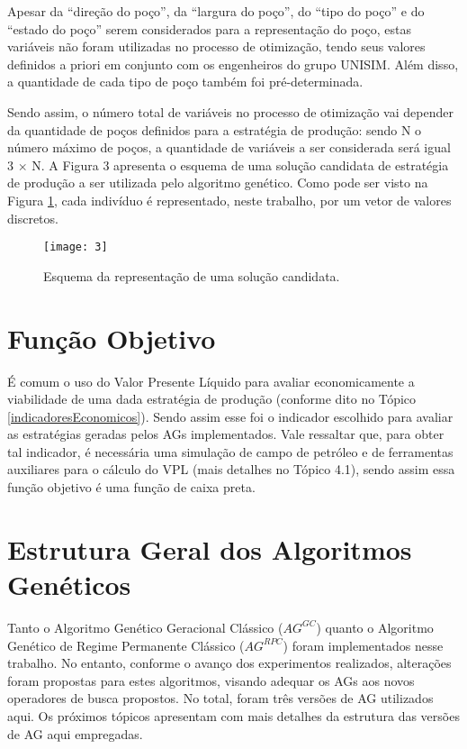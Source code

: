 Apesar da “direção do poço”, da “largura do poço”, do “tipo do poço” e do “estado do poço” serem considerados para a representação do poço, estas variáveis não foram utilizadas no processo de otimização, tendo seus valores definidos a priori em conjunto com os engenheiros do grupo UNISIM. Além disso, a quantidade de cada tipo de poço também foi pré-determinada. 

Sendo assim, o número total de variáveis no processo de otimização vai depender da quantidade de poços definidos para a estratégia de produção: sendo N o número máximo de poços, a quantidade de variáveis a ser considerada será igual 3 $\times$ N. A Figura 3 apresenta o esquema de uma solução candidata de estratégia de produção a ser utilizada pelo algoritmo genético. Como pode ser visto na Figura \ref{fig:fig3_1}, cada indivíduo é representado, neste trabalho, por um vetor de valores discretos.

\begin{figure}[htb]
  \centering
  \texttt{[image: 3]}
  \caption{Esquema da representação de uma solução candidata.}
  \label{fig:fig3_1}
\end{figure}

\section{Função Objetivo}
\label{ch:3_FuncaoObjetivo}
É comum o uso do Valor Presente Líquido para avaliar economicamente a viabilidade de uma dada estratégia de produção (conforme dito no Tópico \ref{indicadoresEconomicos}). Sendo assim esse foi o indicador escolhido para avaliar as estratégias geradas pelos AGs implementados. Vale ressaltar que, para obter tal indicador, é necessária uma simulação de campo de petróleo e de ferramentas auxiliares para o cálculo do VPL (mais detalhes no Tópico 4.1), sendo assim essa função objetivo é uma função de caixa preta. 

\section{Estrutura Geral dos Algoritmos Genéticos}

Tanto o Algoritmo Genético Geracional Clássico ($AG^{GC}$) quanto o Algoritmo Genético de Regime Permanente Clássico ($AG^{RPC}$) foram implementados nesse trabalho. No entanto, conforme o avanço dos experimentos realizados, alterações foram propostas para estes algoritmos, visando adequar os AGs aos novos operadores de busca propostos.  No total, foram três versões de AG utilizados aqui.  Os próximos tópicos apresentam com mais detalhes da estrutura das versões de AG aqui empregadas.

